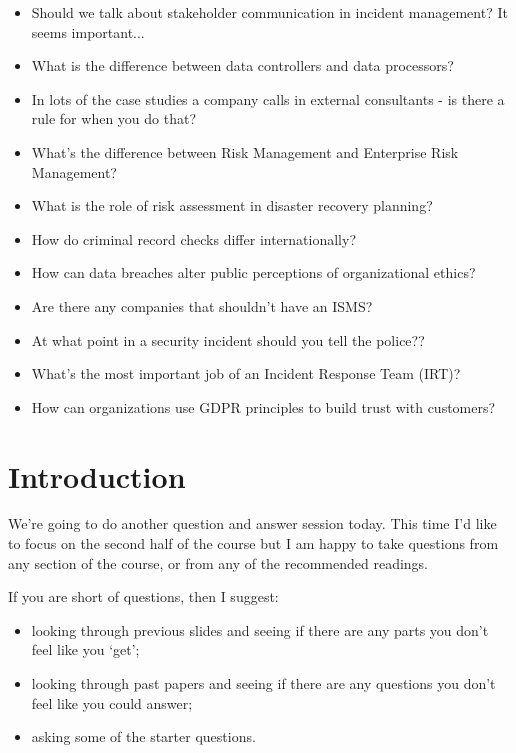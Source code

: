 \documentclass[12pt]{article}
\begin{document}
\begin{itemize}
  \item Should we talk about stakeholder communication in incident management? It seems important...
  \item What is the difference between data controllers and data processors?
  \item In lots of the case studies a company calls in external consultants - is there a rule for when you do that?
  \item What's the difference between Risk Management and Enterprise Risk Management?
  \item What is the role of risk assessment in disaster recovery planning?
  \item How do criminal record checks differ internationally?
  \item How can data breaches alter public perceptions of organizational ethics?
  \item Are there any companies that shouldn't have an ISMS?
  \item At what point in a security incident should you tell the police??
  \item What's the most important job of an Incident Response Team (IRT)?
  \item How can organizations use GDPR principles to build trust with customers?
\end{itemize}


%
%



\maketitle

\section*{Introduction}
We're going to do another question and answer session today. This time I'd like to focus on the second half of the course but I am happy to take questions from any section of the course, or from any of the recommended readings. 

If you are short of questions, then I suggest: 

\begin{itemize} 
\item looking through previous slides and seeing if there are any parts you don't feel like you `get';
\item looking through past papers and seeing if there are any questions you don't feel like you could answer;
\item asking some of the starter questions.
\end{itemize} 
\end{document}
